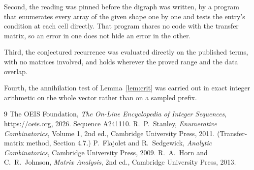 \documentclass[11pt,a4paper]{article}
\theoremstyle{plain}
\theoremstyle{definition}
\begin{document}
Second, the reading was pinned before the digraph was written, by a program that enumerates
every array of the given shape one by one and tests the entry's condition at each cell
directly. That program shares no code with the transfer matrix, so an error in one does not
hide an error in the other.

Third, the conjectured recurrence was evaluated directly on the published terms, with no
matrices involved, and holds wherever the proved range and the data overlap.

Fourth, the annihilation test of Lemma~\ref{lem:crit} was carried out in exact integer
arithmetic on the whole vector rather than on a sampled prefix.

\begin{thebibliography}{9}
 The OEIS Foundation, \emph{The On-Line Encyclopedia of Integer
Sequences}, \url{https://oeis.org}, 2026. Sequence A241110.
 R.~P.~Stanley, \emph{Enumerative Combinatorics}, Volume 1, 2nd ed.,
Cambridge University Press, 2011. (Transfer-matrix method, Section 4.7.)
 P.~Flajolet and R.~Sedgewick, \emph{Analytic Combinatorics}, Cambridge
University Press, 2009.
 R.~A.~Horn and C.~R.~Johnson, \emph{Matrix Analysis}, 2nd ed., Cambridge
University Press, 2013.
\end{thebibliography}
\end{document}
